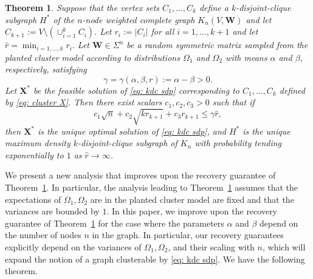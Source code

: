 \documentclass[twoside,11pt]{article}
\newtheorem{theorem}{Theorem}[section]
\newcommand{\bs}{\boldsymbol}
\newcommand{\X}{\bs {X}}
\newcommand{\W}{\bs {W}}
\newcommand{\0}{\bs{0}}
\newcommand{\rbra}[1]{\ensuremath{\left( #1 \right)}} %
\newcommand{\ra}{\rightarrow}
\newcommand{\kdc}{\(k\)-disjoint-clique }
\begin{document}
{\begin{theorem}
	\label{thm: old rec}
	Suppose that the vertex sets \(C_1, \dots, C_k\) define a \kdc subgraph \(H^*\) of the
	\(n\)-node weighted complete graph \(K_n(V, \W)\) and let \(C_{k+1} := V \setminus \rbra{ \cup^k_{i=1} C_i } \).
	Let \(r_i := |C_i|\) for all \(i=1,\dots, k+1\)
	and let \( \hat r = \min_{i=1,\dots,k} r_i.\)
	Let \( \W \in \Sigma^n\) be a random symmetric matrix sampled from the planted cluster model
	according to distributions \(\Omega_1\) and \(\Omega_2\) with means \(\alpha\) and \( \beta\), respectively,	satisfying
	\[
	\gamma = \gamma(\alpha, \beta, r):= 
	\alpha - \beta > 0.
	\]
	Let \(\X^*\) be the feasible solution of \eqref{eq: kdc sdp} corresponding to \(C_1,\dots, C_k\)
	defined by \eqref{eq: cluster X}.
	Then there exist scalars \(c_1, c_2, c_3 > 0\) such that if
	\begin{equation} \label{eq: old rec}
	c_1 \sqrt{n} + c_2 \sqrt{k r_{k+1}} + c_3 r_{k+1} \le \gamma \hat r,
	\end{equation}
	then \( \X^* \) is the unique optimal solution of \eqref{eq: kdc sdp},
	and \( H^*\) is the unique maximum density \kdc subgraph of \(K_n\)
	with probability tending exponentially to \(1\) as \(\hat r \ra \infty\).
\end{theorem}
%
We present a new analysis that improves upon the recovery guarantee of Theorem~\ref{thm: old rec}.
In particular, the analysis leading to Theorem~\ref{thm: old rec} assumes that the expectations of \(\Omega_{1}, \Omega_2\) are 
in the planted cluster model are fixed and that the variances are bounded by \(1\).
In this paper, we improve upon the recovery guarantee of Theorem~\ref{thm: old rec}
for the case where the parameters \(\alpha\) and \(\beta\) depend on the number of nodes \(n\) in the graph.
In particular, our recovery guarantees explicitly depend on the
variances of \(\Omega_{1}, \Omega_2\), and their scaling with $n$, which will expand the notion of a graph
clusterable by \eqref{eq: kdc sdp}. We have the following theorem.

}
\end{document}
